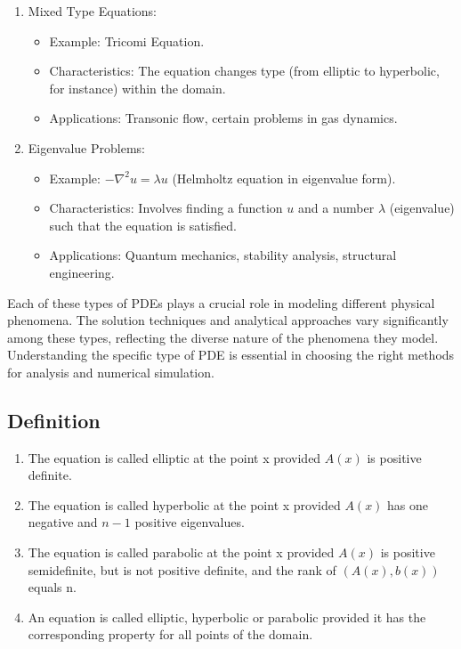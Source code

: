 \documentclass[a4paper,12pt]{article} %
\begin{document}
\begin{enumerate}
\item Mixed Type Equations:
\begin{itemize}
   \item Example: Tricomi Equation.
   \item Characteristics: The equation changes type (from elliptic to hyperbolic, for instance) within the domain.
   \item Applications: Transonic flow, certain problems in gas dynamics.
\end{itemize}

\item Eigenvalue Problems:
\begin{itemize}
   \item Example: \(-\nabla^2 u = \lambda u\) (Helmholtz equation in eigenvalue form).
   \item Characteristics: Involves finding a function \(u\) and a number \(\lambda\) (eigenvalue) such that the equation is satisfied.
   \item Applications: Quantum mechanics, stability analysis, structural engineering.
\end{itemize}

\end{enumerate}
Each of these types of PDEs plays a crucial role in modeling different physical phenomena. The solution techniques and analytical approaches vary significantly among these types, reflecting the diverse nature of the phenomena they model. Understanding the specific type of PDE is essential in choosing the right methods for analysis and numerical simulation.

\subsection{\textbf{Definition}}
\begin{enumerate}
   \item The equation is called elliptic at the point x provided
\(A(x)\) is positive definite.
   \item The equation is called hyperbolic at the point x provided \(A(x)\) has one negative and \(n - 1\) positive eigenvalues.
   \item The equation is called parabolic at the point x provided \(A(x)\) is positive semidefinite, but is not positive definite, and the rank of \((A(x), b(x))\) equals n.
   \item An equation is called elliptic, hyperbolic or parabolic provided it has the corresponding property for all points of the domain.
\end{enumerate}
\end{document}
